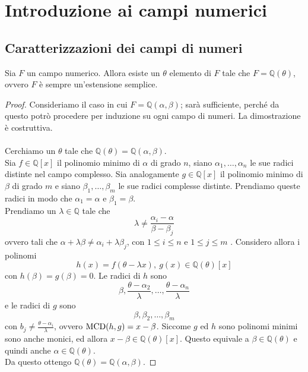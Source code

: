 \section{Introduzione ai campi numerici}
\subsection{Caratterizzazioni dei campi di numeri}
\begin{teorema}
	Sia $F$ un campo numerico. Allora esiste un $\theta$ elemento di $F$ tale che $F=\mathbb{Q}(\theta)$, ovvero $F$ è sempre un'estensione semplice.
\end{teorema}
\begin{proof}
	Consideriamo il caso in cui $F=\mathbb{Q}(\alpha,\beta)$; sarà sufficiente, perché da questo potrò procedere per induzione su ogni campo di numeri. La dimostrazione è costruttiva. \\ \\ 
	Cerchiamo un $\theta$ tale che $\mathbb{Q}(\theta)=\mathbb{Q}(\alpha,\beta)$. \\ Sia $f\in\mathbb{Q}[x]$ il polinomio minimo di $\alpha$ di grado $n$, siano $\alpha_1,\dots,\alpha_n$ le sue radici distinte nel campo complesso. Sia analogamente $g\in\mathbb{Q}[x]$ il polinomio minimo di $\beta$ di grado $m$ e siano $\beta_1,\dots,\beta_m$ le sue radici complesse distinte. Prendiamo queste radici in modo che $\alpha_1=\alpha$ e $\beta_1=\beta$.\\ Prendiamo un $\lambda\in\mathbb{Q}$ tale che 
	\begin{equation*}
	\lambda\neq\frac{\alpha_i-\alpha}{\beta-\beta_j}
	\end{equation*}
	ovvero tali che $\alpha+\lambda\beta\neq\alpha_i+\lambda\beta_j$, con $1\leq i\leq n$ e $1\leq j\leq m$ . Considero allora i polinomi
	\begin{equation*}
	h(x)=f\left(\theta-\lambda x\right), \ g(x)\in\mathbb{Q}(\theta)[x]
	\end{equation*}
	con $h(\beta)=g(\beta)=0$. Le radici di $h$ sono 
	\begin{equation*}
	\beta, \frac{\theta-\alpha_2}{\lambda},\dots,\frac{\theta-\alpha_n}{\lambda}
	\end{equation*}
	e le radici di $g$ sono
	\begin{equation*}
	\beta, \beta_2, \dots, \beta_m
	\end{equation*}
	con $b_j\neq\frac{\theta-\alpha_i}{\lambda}$, ovvero $\operatorname{\mathrm{MCD}}(h,g)=x-\beta$. Siccome $g$ ed $h$ sono polinomi minimi sono anche monici, ed allora $x-\beta\in\mathbb{Q}(\theta)[x]$. Questo equivale a $\beta\in\mathbb{Q}(\theta)$ e quindi anche $\alpha\in\mathbb{Q}(\theta)$.\\ Da questo ottengo $\mathbb{Q}(\theta) = \mathbb{Q}(\alpha,\beta)$.
\end{proof}

